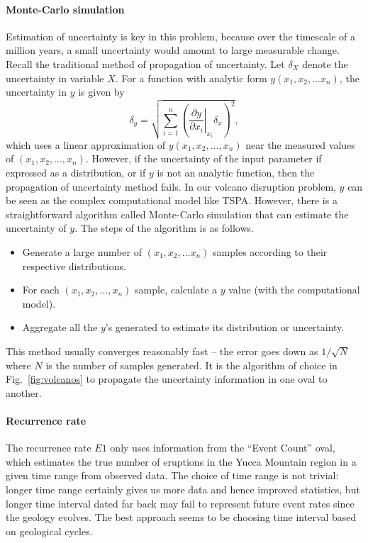 \documentclass[nofootinbib,preprint,aps]{revtex4-1}
\begin{document}
        \paragraph{Monte-Carlo simulation}
        Estimation of uncertainty is key in this problem, because over the timescale of a million years,
        a small uncertainty would amount to large measurable change. Recall the traditional method of
        propagation of uncertainty. Let $\delta_X$ denote the uncertainty in variable $X$. For a function
        with analytic form $y(x_1,x_2,...x_n)$, the uncertainty in $y$ is given by
        \begin{equation}
            \delta_y = \sqrt{\sum\limits_{i=1}^n \left(\left.\frac{\partial y}{\partial x_i}
            \right\rvert_{x_i} \delta_x\right)^2},
        \end{equation}
        which uses a linear approximation of $y(x_1,x_2,...,x_n)$ near the measured values of
        $(x_1,x_2,...,x_n)$.
        However, if the uncertainty of the input parameter if expressed as a distribution, or if $y$ is
        not an analytic function, then the propagation of uncertainty method fails. In our volcano disruption
        problem, $y$ can be seen as the complex computational model like TSPA. However, there is a
        straightforward algorithm called Monte-Carlo simulation that can estimate the uncertainty of $y$.
        The steps of the algorithm is as follows.
        \begin{itemize}
            \item Generate a large number of $(x_1,x_2,...x_n)$ samples according to their respective distributions.
            \item For each $(x_1,x_2,...,x_n)$ sample, calculate a $y$ value (with the computational model).
            \item Aggregate all the $y$'s generated to estimate its distribution or uncertainty.
        \end{itemize}
        This method usually converges reasonably fast -- the error goes down as $1/\sqrt{N}$ where $N$ is the number
        of samples generated. It is the algorithm of choice in Fig.~\ref{fig:volcanos} to
        propagate the uncertainty information in one oval to another.
        \paragraph{Recurrence rate} The recurrence rate $E1$ only uses information from the ``Event Count''
        oval, which estimates the true number of eruptions in the Yucca Mountain region in a given time range
        from observed data. The choice of time range is not trivial: longer time range certainly gives us
        more data and hence improved statistics, but longer time interval dated far back may fail to represent
        future event rates since the geology evolves. The best approach seems to be choosing time interval
        based on geological cycles.
\end{document}
